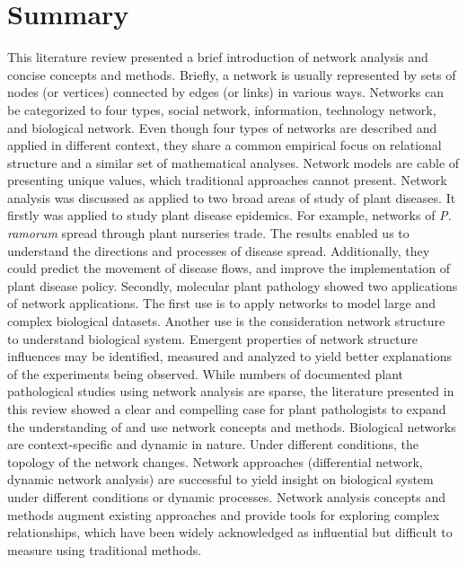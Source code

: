 \section*{Summary}

This literature review presented a brief introduction of network analysis and concise concepts and methods. Briefly, a network is usually represented by sets of nodes (or vertices) connected by edges (or links) in various ways. Networks can be categorized to four types, social network, information, technology network, and biological network. Even though four types of networks are described and applied in different context, they share a common empirical focus on relational structure and a similar set of mathematical analyses. Network models are cable of presenting unique values, which traditional approaches cannot present. Network analysis was discussed as applied to two broad areas of study of plant diseases. It firstly was applied to study plant disease epidemics. For example, networks of \textit{P. ramorum} spread through plant nurseries trade. The results enabled us to understand the directions and processes of disease spread. Additionally, they could predict the movement of disease flows, and improve the implementation of plant disease policy. Secondly, molecular plant pathology showed two applications of network applications. The first use is to apply networks to model large and complex biological datasets. Another use is the consideration network structure to understand biological system. Emergent properties of network structure influences may be identified, measured and analyzed to yield better explanations of the experiments being observed. While numbers of documented plant pathological studies using network analysis are sparse, the literature presented in this review showed a clear and compelling case for plant pathologists to expand the understanding of and use network concepts and methods. 
Biological networks are context-specific and dynamic in nature. Under different conditions, the topology of the network changes. Network approaches (differential network, dynamic network analysis) are successful to yield insight on biological system under different conditions or dynamic processes. Network analysis concepts and methods augment existing approaches and provide tools for exploring complex relationships, which have been widely acknowledged as influential but difficult to measure using traditional methods. 

